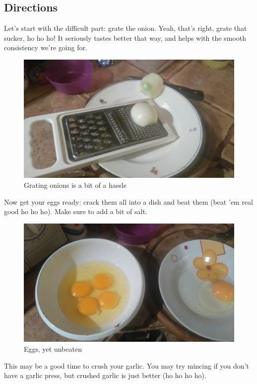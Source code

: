 \documentclass{article}
\begin{document}
\subsection{Directions}
Let's start with the difficult part: grate the onion. Yeah, that's right, grate that sucker, ho ho ho! It seriously tastes better that way, and helps with the smooth consistency we're going for.

\begin{figure}[!htbp]
\includegraphics[width=\textwidth]{meatloaf_01}
\caption{Grating onions is a bit of a hassle}
\end{figure}

Now get your eggs ready: crack them all into a dish and beat them (beat 'em real good ho ho ho). Make sure to add a bit of salt.

\begin{figure}[!htbp]
\includegraphics[width=\textwidth]{meatloaf_03}
\caption{Eggs, yet unbeaten}
\end{figure}

This may be a good time to crush your garlic. You may try mincing if you don't have a garlic press, but crushed garlic is just better (ho ho ho ho).
\end{document}
